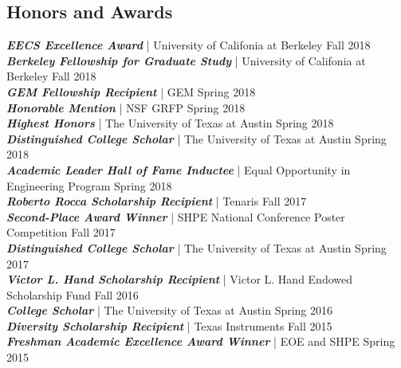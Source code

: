 \documentclass[letter]{res}
\begin{document}
\begin{resume}
\section{Honors and Awards}
{\sl \textbf{EECS Excellence Award}} | University of Califonia at Berkeley \hfill Fall 2018\\
{\sl \textbf{Berkeley Fellowship for Graduate Study}} | University of Califonia at Berkeley \hfill Fall 2018\\
{\sl \textbf{GEM Fellowship Recipient}} | GEM \hfill Spring 2018\\
{\sl \textbf{Honorable Mention}} | NSF GRFP \hfill Spring 2018\\
{\sl \textbf{Highest Honors}} | The University of Texas at Austin  \hfill Spring 2018\\
{\sl \textbf{Distinguished College Scholar}} | The University of Texas at Austin  \hfill Spring 2018\\
{\sl \textbf{Academic Leader Hall of Fame Inductee}} | Equal Opportunity in Engineering Program  \hfill Spring 2018\\
{\sl \textbf{Roberto Rocca Scholarship Recipient}} | Tenaris \hfill Fall 2017\\
{\sl \textbf{Second-Place Award Winner}} | SHPE National Conference Poster Competition  \hfill Fall 2017\\
{\sl \textbf{Distinguished College Scholar}} | The University of Texas at Austin  \hfill Spring 2017\\
{\sl \textbf{Victor L. Hand Scholarship Recipient}} | Victor L. Hand Endowed Scholarship Fund \hfill Fall 2016\\
{\sl \textbf{College Scholar}} | The University of Texas at Austin \hfill Spring 2016\\
{\sl \textbf{Diversity Scholarship Recipient}} | Texas Instruments \hfill Fall 2015\\
{\sl \textbf{Freshman Academic Excellence Award Winner}} | EOE and SHPE \hfill Spring 2015\\

\end{resume}
\end{document}
